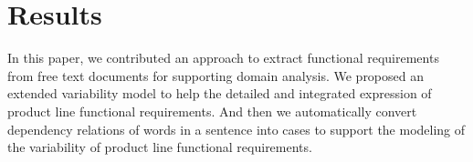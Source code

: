 \section{Results}
\begin{minipage}{\linewidth}
	\begin{multicols*}{2}
		In this paper, we contributed an approach to extract functional requirements from free text documents for supporting domain analysis. We proposed an extended variability model to help the detailed and integrated expression of product line functional requirements. And then we automatically convert dependency relations of words in a sentence into cases to support the modeling of the variability of product line functional requirements.
	\end{multicols*}
\end{minipage}
